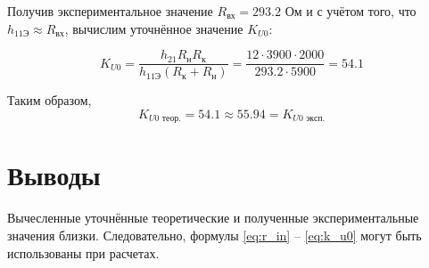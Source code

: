 Получив экспериментальное значение $R_\text{вх} = 293.2$ Ом и с учётом того, что $h_{11\text{Э}} \approx R_\text{вх}$, вычислим уточнённое значение $K_{U0}$: 

\[
K_{U0} = \frac{h_{21}R_\text{н}R_\text{к}}{h_\text{11Э}(R_\text{к}+R_\text{н})} = \frac{12 \cdot 3900 \cdot 2000}{293.2 \cdot 5900} = 54.1
\]

Таким образом, 
\[
K_{U0\text{ теор.}} = 54.1 \approx 55.94 = K_{U0\text{ эксп.}}
\]

\section{Выводы}

Вычесленные уточнённые теоретические и полученные экспериментальные значения близки. Следовательно, формулы \ref{eq:r_in} -- \ref{eq:k_u0} могут быть использованы при расчетах.

